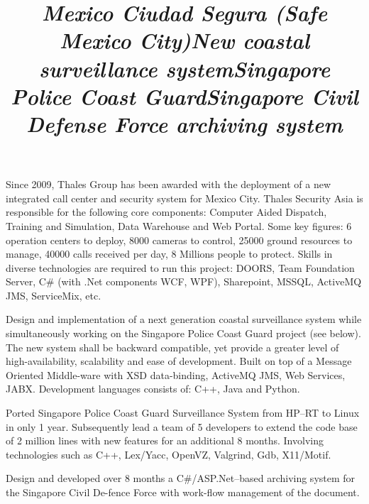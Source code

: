 \documentclass[overlapped,line,letterpaper]{res}
\begin{document}
\begin{resume}
  \title{\em Mexico Ciudad Segura (Safe Mexico City)}
  \begin{position}
    Since 2009, Thales Group has been awarded with the deployment of a new
    integrated call center and security system for Mexico City. Thales Security
    Asia is responsible for the following core components: Computer Aided
    Dispatch, Training and Simulation, Data Warehouse and Web Portal. Some key
    figures: 6 operation centers to deploy, 8000 cameras to control, 25000
    ground resources to manage, 40000 calls received per day, 8 Millions people
    to protect. Skills in diverse technologies are required to run this
    project: DOORS, Team Foundation Server, C\# (with .Net components WCF, WPF),
    Sharepoint, MSSQL, ActiveMQ JMS, ServiceMix, etc.
  \end{position}

  \title{\em New coastal surveillance system}
  \begin{position}
    Design and implementation of a next generation coastal surveillance system
    while simultaneously working on the Singapore Police Coast Guard project
    (see below). The new system shall be backward compatible, yet provide a
    greater level of high-availability, scalability and ease of
    development. Built on top of a Message Oriented Middle-ware with XSD
    data-binding, ActiveMQ JMS, Web Services, JABX. Development languages
    consists of: C++, Java and Python.
  \end{position}

  \title{\em Singapore Police Coast Guard}
  \begin{position}
    Ported Singapore Police Coast Guard Surveillance System from HP--RT to Linux
    in only 1 year. Subsequently lead a team of 5 developers to extend the code
    base of 2 million lines with new features for an additional 8 months.
    Involving technologies such as C++, Lex/Yacc, OpenVZ, Valgrind, Gdb,
    X11/Motif.
  \end{position}

  \title{\em Singapore Civil Defense Force archiving system}
  \begin{position}
    Design and developed over 8 months a C\#/ASP.Net--based archiving system for
    the Singapore Civil De-fence Force with work-flow management of the
    document.
  \end{position}


\end{resume}
\end{document}
